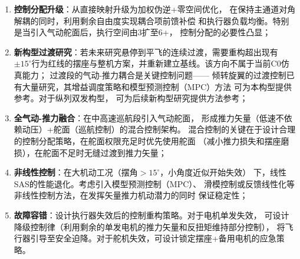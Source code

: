 \begin{enumerate}[label=(\arabic*)]
    \item \textbf{控制分配升级}：从直接映射升级为加权伪逆+零空间优化，
          在保持主通道对角解耦的同时，利用剩余自由度实现耦合项前馈补偿
          和执行器负载均衡。特别是当引入气动舵面后，执行空间由3扩至6+，
          控制分配的必要性凸显；
    \item \textbf{新构型过渡研究}：若未来研究悬停到平飞的连续过渡，需要重构超出现有
          $\pm15^\circ$行为红线的摆座与整机方案，并重新建立基线。该方向不属于当前C0仿真能力；
          过渡段的气动-推力耦合是关键控制问题——
          倾转旋翼的过渡控制已有大量研究，其增益调度策略和模型预测控制（MPC）方法
          可为本构型提供参考\cite{kang2009control,kim2003nonlinear}。对于纵列双发构型，
          可为后续新构型研究提供方法参考；
    \item \textbf{全气动-推力融合}：在中高速巡航段引入气动舵面，
          形成推力矢量（低速不依赖动压）+舵面（巡航控制）的混合控制架构。
          混合控制的关键在于设计合理的控制分配策略，在舵面权限充足时优先使用舵面
          （减小推力损失和摆座磨损），在舵面不足时无缝过渡到推力矢量；
    \item \textbf{非线性控制}：在大机动工况（摆角$>15^\circ$，小角度近似开始失效）
          下，线性SAS的性能退化。考虑引入模型预测控制（MPC）、
          滑模控制或反馈线性化等非线性控制方法，在发挥矢量推力机动潜力的同时
          保证稳定性；
    \item \textbf{故障容错}：设计执行器失效后的控制重构策略。对于电机单发失效，
          可设计降级控制律（利用剩余的单发电机的推力矢量和反扭矩维持部分控制），
          将飞行器引导至安全迫降。对于舵机失效，可设计锁定摆座+备用电机的应急策略。
\end{enumerate}
